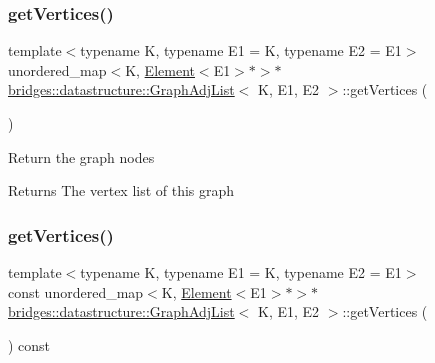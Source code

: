 \subsubsection{\texorpdfstring{getVertices()}{getVertices()}\hspace{0.1cm}{\footnotesize\ttfamily [1/2]}}
{\footnotesize\ttfamily template$<$typename K, typename E1 = K, typename E2 = E1$>$ \\
unordered\+\_\+map$<$K, \mbox{\hyperlink{classbridges_1_1datastructure_1_1_element}{Element}}$<$E1$>$$\ast$$>$$\ast$ \mbox{\hyperlink{classbridges_1_1datastructure_1_1_graph_adj_list}{bridges\+::datastructure\+::\+Graph\+Adj\+List}}$<$ K, E1, E2 $>$\+::get\+Vertices (\begin{DoxyParamCaption}{ }\end{DoxyParamCaption})\hspace{0.3cm}{\ttfamily [inline]}}

Return the graph nodes

\begin{DoxyReturn}{Returns}
The vertex list of this graph 
\end{DoxyReturn}
\mbox{\label{classbridges_1_1datastructure_1_1_graph_adj_list_a77b21cfdb87c4cf45ce29be6e7dd9791}} 
\subsubsection{\texorpdfstring{getVertices()}{getVertices()}\hspace{0.1cm}{\footnotesize\ttfamily [2/2]}}
{\footnotesize\ttfamily template$<$typename K, typename E1 = K, typename E2 = E1$>$ \\
const unordered\+\_\+map$<$K, \mbox{\hyperlink{classbridges_1_1datastructure_1_1_element}{Element}}$<$E1$>$$\ast$$>$$\ast$ \mbox{\hyperlink{classbridges_1_1datastructure_1_1_graph_adj_list}{bridges\+::datastructure\+::\+Graph\+Adj\+List}}$<$ K, E1, E2 $>$\+::get\+Vertices (\begin{DoxyParamCaption}{ }\end{DoxyParamCaption}) const\hspace{0.3cm}{\ttfamily [inline]}}


